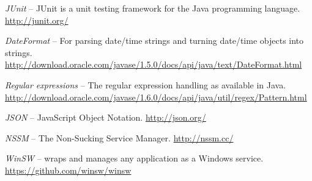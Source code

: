 \begin{thebibliography}{999}
		\textit{JUnit} -- JUnit is a unit testing framework for the Java
		programming language. \\
		\url{http://junit.org/}{}
		
		\textit{DateFormat} -- For parsing date/time strings and turning date/time
		objects into strings.
		\url{http://download.oracle.com/javase/1.5.0/docs/api/java/text/DateFormat.html}{}
		
		\textit{Regular expressions} -- The regular expression handling as available
		in Java.
		\url{http://download.oracle.com/javase/1.6.0/docs/api/java/util/regex/Pattern.html}{}

		\textit{JSON} -- JavaScript Object Notation.
		\url{http://json.org/}{}

		\textit{NSSM} -- The Non-Sucking Service Manager.
		\url{http://nssm.cc/}{}

		\textit{WinSW} -- wraps and manages any application as a Windows service.
		\url{https://github.com/winsw/winsw}{}

\end{thebibliography}
